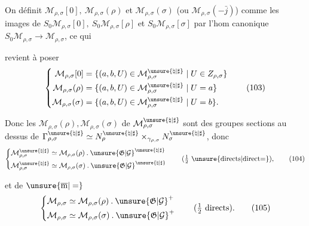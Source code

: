 On définit $\mathcal{M}_{\rho,\sigma}[0],\ \mathcal{M}_{\rho,\sigma}(\rho)$
et $\mathcal{M}_{\rho,\sigma}(\sigma)$ (ou $\mathcal{M}_{\rho,\sigma}(-\bar{j})$) comme les images de
$S_0\mathcal{M}_{\rho,\sigma}[0],\ S_0\mathcal{M}_{\rho,\sigma}[\rho]$ et
$S_0\mathcal{M}_{\rho,\sigma}[\sigma]$ par l'hom canonique
$S_0\mathcal{M}_{\rho,\sigma}\longrightarrow\mathcal{M}_{\rho,\sigma}$, ce qui




revient à poser
\[
\left\{\begin{aligned}
\mathcal{M}_{\rho,\sigma}[0]
&=\{(a,b,U)\in\mathcal{M}_{\rho,\sigma}^{\unsure{\natural|\sharp}}\mid U\in Z_{\rho,\sigma}\}\\
\mathcal{M}_{\rho,\sigma}(\rho)
&=\{(a,b,U)\in\mathcal{M}_{\rho,\sigma}^{\unsure{\natural|\sharp}}\mid U=a\}\\
\mathcal{M}_{\rho,\sigma}(\sigma)
&=\{(a,b,U)\in\mathcal{M}_{\rho,\sigma}^{\unsure{\natural|\sharp}}\mid U=b\}.
\end{aligned}\right.
\tag{103}
\]

Donc les  $\mathcal{M}_{\rho,\sigma}(\rho),\mathcal{M}_{\rho,\sigma}(\sigma)$ de $\mathcal{M}_{\rho,\sigma}^{\unsure{\natural|\sharp}}$ sont des groupes sections au dessus de $\Gamma_{\rho,\sigma}^{\unsure{\natural|\sharp}}\simeq N_\rho^{\unsure{\natural|\sharp}}\mathbin{\times}_{\gamma_{\rho,\sigma}}N_\sigma^{\unsure{\natural|\sharp}}$, donc
\[
\left\{\begin{aligned}
\mathcal{M}_{\rho,\sigma}^{\unsure{\natural|\sharp}}
&\simeq\mathcal{M}_{\rho,\sigma}(\rho)\mathbin{.}\unsure{\mathfrak{G}|\mathcal{G}}^{\unsure{\natural|\sharp}}\\
\mathcal{M}_{\rho,\sigma}^{\unsure{\natural|\sharp}}
&\simeq\mathcal{M}_{\rho,\sigma}(\sigma)\mathbin{.}\unsure{\mathfrak{G}|\mathcal{G}}^{\unsure{\natural|\sharp}}
\end{aligned}\right.
\qquad(\tfrac12\ \text{\unsure{directs|direct=}}),
\tag{104}
\]

et de $\unsure{\overline{\mathrm m}|=}$
\[
\left\{\begin{aligned}
\mathcal{M}_{\rho,\sigma}&\simeq\mathcal{M}_{\rho,\sigma}(\rho)\mathbin{.}\unsure{\mathfrak{G}|\mathcal{G}}^+\\
\mathcal{M}_{\rho,\sigma}&\simeq\mathcal{M}_{\rho,\sigma}(\sigma)\mathbin{.}\unsure{\mathfrak{G}|\mathcal{G}}^+
\end{aligned}\right.
\qquad(\tfrac12\ \text{directs}).
\tag{105}
\]

